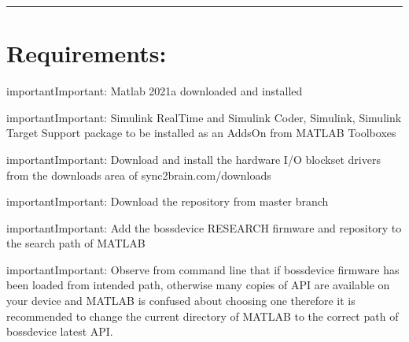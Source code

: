 \documentclass[letterpaper,10pt,english]{sphinxmanual}
\begin{document}
\begin{sphinxVerbatim}[commandchars=\\\{\}]
\end{sphinxVerbatim}


\bigskip\hrule\bigskip



\section{Requirements:}
\label{\detokenize{6_downloads_n_dependencies:requirements}}
\begin{sphinxadmonition}{important}{Important:}
\sphinxAtStartPar
Matlab 2021a downloaded and installed
\end{sphinxadmonition}

\begin{sphinxadmonition}{important}{Important:}
\sphinxAtStartPar
Simulink Real\sphinxhyphen{}Time and Simulink Coder, Simulink, Simulink Target Support package to be installed as an Adds\sphinxhyphen{}On from MATLAB Toolboxes
\end{sphinxadmonition}

\begin{sphinxadmonition}{important}{Important:}
\sphinxAtStartPar
Download and install the hardware I/O blockset drivers from the downloads area of sync2brain.com/downloads
\end{sphinxadmonition}

\begin{sphinxadmonition}{important}{Important:}
\sphinxAtStartPar
Download the repository from master branch
\end{sphinxadmonition}

\begin{sphinxadmonition}{important}{Important:}
\sphinxAtStartPar
Add the bossdevice RESEARCH firmware and repository to the search path of MATLAB
\end{sphinxadmonition}

\begin{sphinxadmonition}{important}{Important:}
\sphinxAtStartPar
Observe from command line that if bossdevice firmware has been loaded from intended path, otherwise many copies of API are available on your device and MATLAB is confused about choosing one therefore it is recommended to change the current directory of MATLAB to the correct path of bossdevice latest API.
\end{sphinxadmonition}
\end{document}
